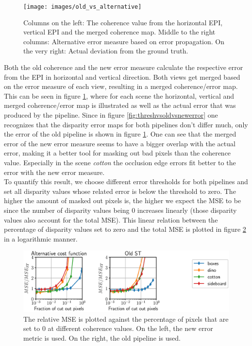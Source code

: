 \documentclass  [
  paper    = a4,
  BCOR     = 10mm,
  twoside,
  fontsize = 12pt,
  fleqn,
  toc      = bibnumbered,
  toc      = listofnumbered,
  numbers  = noendperiod,
  headings = normal,
  listof   = leveldown,
  version  = 3.03
]                                       {scrreprt}
\begin{document}
\begin{figure}[h!]
	\centering
	\texttt{[image: images/old\_vs\_alternative]}
	\caption[Old coherence vs new error]{Columns on the left: The coherence value from the horizontal EPI, vertical EPI and the merged coherence map. Middle to the right columns: Alternative error measure based on error propagation. On the very right: Actual deviation from the ground truth.}
	\label{fig:oldvsalternative}
\end{figure}
Both the old coherence and the new error measure calculate the respective error from the EPI in horizontal and vertical direction. Both views get merged based on the error measure of each view, resulting in a merged coherence/error map. This can be seen in figure \ref{fig:oldvsalternative}, where for each scene the horizontal, vertical and merged coherence/error map is illustrated as well as the actual error that was produced by the pipeline.
Since in figure \ref{fig:threshvsoldvsnewerror} one recognizes that the disparity error maps for both pipelines don't differ much, only the error of the old pipeline is shown in figure \ref{fig:oldvsalternative}. One can see that the merged error of the new error measure seems to have a bigger overlap with the actual error, making it a better tool for masking out bad pixels than the coherence value. Especially in the scene \textit{cotton} the occlusion edge errors fit better to the error with the new error measure.\\
To quantify this result, we choose different error thresholds for both pipelines and set all disparity values whose related error is below the threshold to zero. The higher the amount of masked out pixels is, the higher we expect the MSE to be since the number of disparity values being 0 increases linearly (those disparity values also account for the total MSE). This linear relation between the percentage of disparity values set to zero and the total MSE is plotted in figure \ref{fig:newerrorconfidence} in a logarithmic manner.
\begin{figure}[h!]
	\centering
	\includegraphics[width=1\linewidth]{images/newerror_confidence}
	\caption[Dependence of error on cut out pixels]{The relative MSE is plotted against the percentage of pixels that are set to 0 at different coherence values. On the left, the new error metric is used. On the right, the old pipeline is used.}
	\label{fig:newerrorconfidence}
\end{figure}
\end{document}
